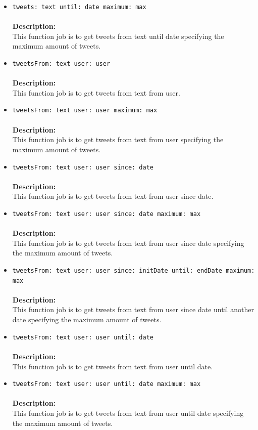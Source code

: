 \begin{itemize}
\begin{itemize}
\begin{itemize}
\begin{itemize}
\item \verb~tweets: text until: date maximum: max~\\\\
\textbf{Description:}\\
      This function job is to get tweets from text until date specifying the maximum amount of tweets.\\
\item \verb~tweetsFrom: text user: user~\\\\
\textbf{Description:}\\
      This function job is to get tweets from text from user.\\
\item \verb~tweetsFrom: text user: user maximum: max~\\\\
\textbf{Description:}\\
      This function job is to get tweets from text from user specifying the maximum amount of tweets.\\
\item \verb~tweetsFrom: text user: user since: date~\\\\
\textbf{Description:}\\
      This function job is to get tweets from text from user since date.\\
\item \verb~tweetsFrom: text user: user since: date maximum: max~\\\\
\textbf{Description:}\\
      This function job is to get tweets from text from user since date specifying the maximum amount of tweets.\\
\item \verb~tweetsFrom: text user: user since: initDate until: endDate maximum: max~\\\\
\textbf{Description:}\\
      This function job is to get tweets from text from user since date until another date specifying the maximum amount of tweets.\\
\item \verb~tweetsFrom: text user: user until: date~\\\\
\textbf{Description:}\\
      This function job is to get tweets from text from user until date.\\
\item \verb~tweetsFrom: text user: user until: date maximum: max~\\\\
\textbf{Description:}\\
      This function job is to get tweets from text from user until date specifying the maximum amount of tweets.
\end{itemize}



\end{itemize}
\end{itemize}
\end{itemize}
